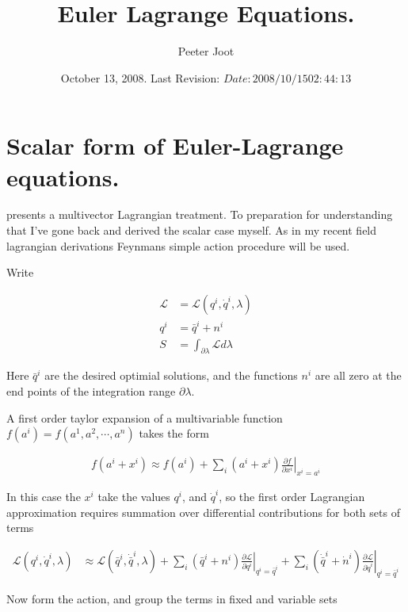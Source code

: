 \documentclass{article}
\title{Euler Lagrange Equations.}
\author{Peeter Joot}
\date{ October 13, 2008.  Last Revision: $Date: 2008/10/15 02:44:13 $ }
\newcommand{\LL}[0]{\mathcal{L}}
\newcommand{\qdot}[0]{\dot{q}}
\newcommand{\ndot}[0]{\dot{n}}
\newcommand{\qbar}[0]{\bar{q}}
\newcommand{\qdotbar}[0]{\dot{\bar{q}}}
\newcommand{\PD}[2]{\frac{\partial {#2}}{\partial {#1}}}
\begin{document}
\maketitle{}

\tableofcontents

\section{Scalar form of Euler-Lagrange equations.}

\cite{lasenby1993mda} presents a multivector Lagrangian treatment.  To
preparation for understanding that I've gone 
back and derived the scalar
case myself.  As in my recent field lagrangian derivations Feynmans
\cite{feynman1963flp} simple action procedure will be used.

Write 

\begin{align*}
\LL &= \LL(q^i, \qdot^i, \lambda) \\
q^i &= \qbar^i + n^i \\
S &= \int_{\partial \lambda} \LL d\lambda
\end{align*}

Here $\qbar^i$ are the desired optimial solutions, and the functions $n^i$
are all zero at the end points of the integration range $\partial \lambda$.

A first order taylor expansion of a multivariable function
$f(a^i) = f(a^1, a^2, \cdots, a^n)$
takes the form

\begin{align*}
f(a^i + x^i) \approx f(a^i) + \sum_i (a^i + x^i) \left. \PD{x^i}{f} \right\vert_{x^i = a^i}
\end{align*}

In this case the $x^i$ take the values $q^i$, and $\qdot^i$, so the first
order Lagrangian approximation requires summation over differential contributions for both sets of terms

\begin{align}\label{eqn:linearizedLagrangian}
\LL(q^i, \qdot^i, \lambda) 
&\approx \LL(\qbar^i, \qdotbar^i, \lambda) 
+ \sum_i (\qbar^i + n^i) \left. \PD{q^i}{\LL} \right\vert_{q^i = \qbar^i}
+ \sum_i (\qdotbar^i + \ndot^i) \left. \PD{\qdot^i}{\LL} \right\vert_{q^i = \qbar^i}
\end{align}

%
Now form the action, and group the terms in fixed and variable sets
\end{document}
